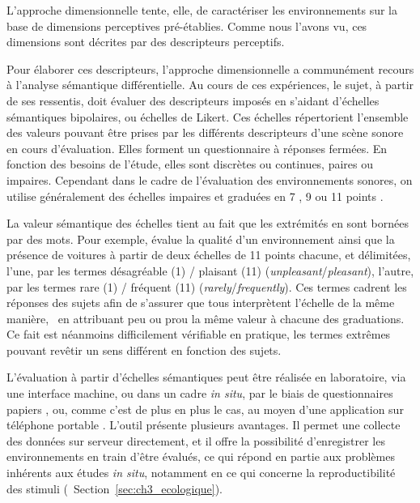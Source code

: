 L'approche dimensionnelle tente, elle, de caractériser les environnements sur la base de dimensions perceptives pré-établies. Comme nous l'avons vu, ces dimensions sont décrites par des descripteurs perceptifs.

Pour élaborer ces descripteurs, l'approche dimensionnelle a communément recours à l'analyse sémantique différentielle. Au cours de ces expériences, le sujet, à partir de ses ressentis, doit évaluer des descripteurs imposés en s'aidant d'échelles sémantiques bipolaires, ou échelles de Likert. Ces échelles répertorient l'ensemble des valeurs pouvant être prises par les différents descripteurs d'une scène sonore en cours d'évaluation. Elles forment un questionnaire à réponses fermées. En fonction des besoins de l'étude, elles sont discrètes ou continues, paires ou impaires. Cependant dans le cadre de l'évaluation des environnements sonores, on utilise généralement des échelles impaires et graduées en 7 \citep{raimbault2006qualitative}, 9 \citep{hall2013exploratory} ou 11 points \citep{ricciardi2015sound}.

La valeur sémantique des échelles tient au fait que les extrémités en sont bornées par des mots. Pour exemple, \citep{ricciardi2015sound} évalue la qualité d'un environnement ainsi que la présence de voitures à partir de deux échelles de 11 points chacune, et délimitées, l'une, par les termes désagréable (1) / plaisant (11) (\emph{unpleasant}/\emph{pleasant}), l'autre, par les termes rare (1) / fréquent (11) (\emph{rarely}/\emph{frequently}). Ces termes cadrent les réponses des sujets afin de s'assurer que tous interprètent l'échelle de la même manière, \ie~en attribuant  peu ou prou la même valeur à chacune des graduations. Ce fait est néanmoins difficilement vérifiable en pratique, les termes extrêmes pouvant revêtir un sens différent en fonction des sujets.

L'évaluation à partir d'échelles sémantiques peut être réalisée en laboratoire, via une interface machine, ou dans un cadre \emph{in situ}, par le biais de questionnaires papiers \citep{jeon2013soundwalk,torija2013application}, ou, comme c'est de plus en plus le cas, au moyen d'une application sur téléphone portable \citep{kardous2014evaluation,ricciardi2015sound}. L'outil présente plusieurs avantages. Il permet une collecte des données sur serveur directement, et il offre la possibilité d'enregistrer les environnements en train d'être évalués, ce qui répond en partie aux problèmes inhérents aux études \emph{in situ}, notamment en ce qui concerne la reproductibilité des stimuli (\cf~Section~\ref{sec:ch3_ecologique}).

